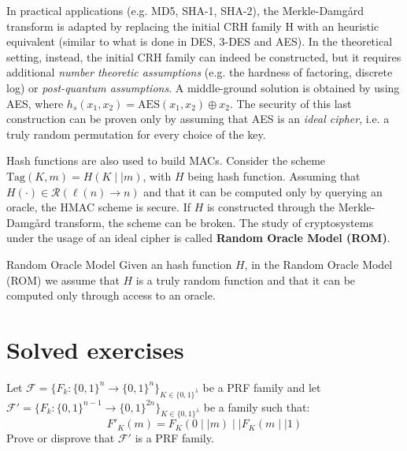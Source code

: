 \documentclass[a4paper, 12pt]{report}
\begin{document}
    In practical applications (e.g. MD5, SHA-1, SHA-2), the Merkle-Damg\aa rd transform is adapted by replacing the initial CRH  family $\mathrm{H}$ with an heuristic equivalent (similar to what is done in DES, 3-DES and AES). In the theoretical setting, instead, the initial CRH family can indeed be constructed, but it requires additional \textit{number theoretic assumptions} (e.g. the hardness of factoring, discrete log) or \textit{post-quantum assumptions}. A middle-ground solution is obtained by using AES, where $h_s(x_1, x_2) = \mathrm{AES}(x_1, x_2) \oplus x_2$. The security of this last construction can be proven only by assuming that AES is an \textit{ideal cipher}, i.e. a truly random permutation for every choice of the key.

    Hash functions are also used to build MACs. Consider the scheme $\mathrm{Tag}(K, m) = H(K \mid\mid m)$, with $H$ being hash function. Assuming that $H(\cdot) \in \mathcal{R}(\ell(n) \to n)$ and that it can be computed only by querying an oracle, the HMAC scheme is secure. If $H$ is constructed through the Merkle-Damg\aa rd transform, the scheme can be broken. The study of cryptosystems under the usage of an ideal cipher is called \textbf{Random Oracle Model (ROM)}.

    \begin{framedass}{Random Oracle Model}
        Given an hash function $H$, in the Random Oracle Model (ROM) we assume that $H$ is a truly random function and that it can be computed only through access to an oracle. 
    \end{framedass}

    \section{Solved exercises}

    \begin{framedprob}{}
        Let $\mathcal{F} = \{F_k : \{0,1\}^n \to \{0,1\}^n\}_{K \in \{0,1\}^\lambda}$ be a PRF family and let $\mathcal{F}' = \{F_k : \{0,1\}^{n-1} \to \{0,1\}^{2n}\}_{K \in \{0,1\}^\lambda}$ be a family such that:
        \[F'_K(m) = F_K(0 \mid\mid m) \mid\mid F_K(m \mid\mid 1)\]
        Prove or disprove that $\mathcal{F}'$ is a PRF family.
    \end{framedprob}
\end{document}
